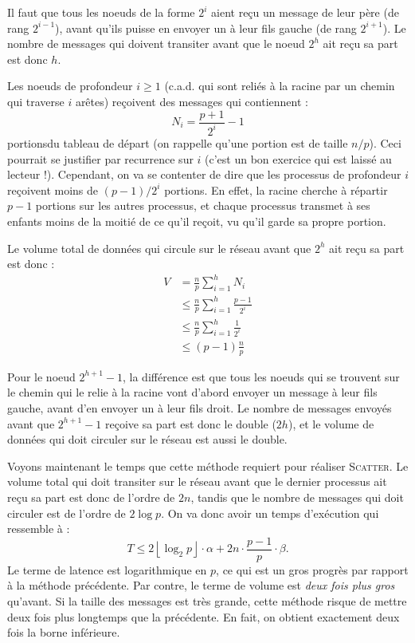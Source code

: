 
Il faut que tous les noeuds de la forme $2^i$ aient reçu un message de leur père
(de rang $2^{i-1}$), avant qu'ils puisse en envoyer un à leur fils gauche (de
rang $2^{i+1}$). Le nombre de messages qui doivent transiter avant que le noeud
$2^h$ ait reçu sa part est donc $h$.

Les noeuds de profondeur $i\geq 1$ (c.a.d. qui sont reliés à la racine
par un chemin qui traverse $i$ arêtes) reçoivent des messages qui
contiennent :
\[
N_i = \frac{p+1}{2^i}-1
\]
\og portions\fg du tableau de départ (on rappelle qu'une portion est de taille
$n/p$). Ceci pourrait se justifier par recurrence sur $i$ (c'est un bon exercice
qui est laissé au lecteur !). Cependant, on va se contenter de dire que les
processus de profondeur $i$ reçoivent moins de $(p-1)/2^i$ portions. En effet,
la racine cherche à répartir $p-1$ portions sur les autres processus, et chaque
processus transmet à ses enfants moins de la moitié de ce qu'il reçoit, vu qu'il
garde sa propre portion.

Le volume total de données qui circule sur le réseau avant que $2^h$
ait reçu sa part est donc :
\begin{align*}
V &= \frac{n}{p}  \sum_{i=1}^h N_i \\
   &\leq \frac{n}{p}  \sum_{i=1}^h \frac{p-1}{2^i}\\
   &\leq \frac{n}{p}  \sum_{i=1}^h \frac{1}{2^i}\\
   &\leq (p-1) \frac{n}{p}
\end{align*}


Pour le noeud $2^{h+1}-1$, la différence est que tous les noeuds qui se trouvent
sur le chemin qui le relie à la racine vont d'abord envoyer un message à leur
fils gauche, avant d'en envoyer un à leur fils droit. Le nombre de messages
envoyés avant que $2^{h+1}-1$ reçoive sa part est donc le double ($2h$), et le
volume de données qui doit circuler sur le réseau est aussi le double.

Voyons maintenant le temps que cette méthode requiert pour réaliser
\textsc{Scatter}. Le volume total qui doit transiter sur le réseau avant que le
dernier processus ait reçu sa part est donc de l'ordre de $2n$, tandis que le
nombre de messages qui doit circuler est de l'ordre de $2 \log p$. On va donc
avoir un temps d'exécution qui ressemble à :
\[
T \leq 2 \left\lfloor \log_2 p \right\rfloor \cdot \alpha + 2n \cdot \frac{p-1}{p}\cdot \beta.
\]
Le terme de latence est logarithmique en $p$, ce qui est un gros progrès par
rapport à la méthode précédente. Par contre, le terme de volume est \emph{deux
  fois plus gros} qu'avant. Si la taille des messages est très grande, cette
méthode risque de mettre deux fois plus longtemps que la précédente. En fait, on
obtient exactement deux fois la borne inférieure.

